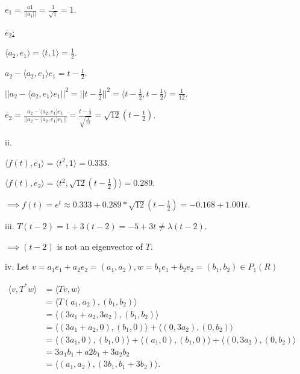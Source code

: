 \documentclass{article}
\begin{document}
  $e_1 = \frac{a1}{||a_1||} 
  = \frac{1}{\sqrt{1}} 
  = 1$.
  \newline

  \underline{$e_2$:}

  $\langle a_2, e_1\rangle 
  = \langle t, 1\rangle 
  = \frac{1}{2}$.
  \newline

  $a_2 - \langle a_2, e_1\rangle e_1 
  = t - \frac{1}{2}$.
  \newline

  $||a_2 - \langle a_2, e_1\rangle e_1||^2
  = ||t - \frac{1}{2}||^2
  = \langle t - \frac{1}{2}, t - \frac{1}{2}\rangle
  = \frac{1}{12}$.
  \newline

  $e_2 
  = \frac{a_2 - \langle a_2, e_1\rangle e_1}{||a_2 - \langle a_2, e_1\rangle e_1||}
  = \frac{t - \frac{1}{2}}{\sqrt{\frac{1}{12}}}
  = \sqrt{12}(t - \frac{1}{2})$.
  \newline


  ii. 

  $\langle f(t), e_1\rangle
  =
  \langle t^2, 1\rangle
  =
  0.333$.
  \newline

  $\langle f(t), e_2\rangle
  =
  \langle t^2, \sqrt{12}(t - \frac{1}{2})\rangle
  =
  0.289$.
  \newline

  $\implies f(t) 
  = e^t 
  \approx 
  0.333 + 0.289*\sqrt{12}(t - \frac{1}{2})
  = -0.168 + 1.001t$.
  \newline


  iii. 
  $T(t-2)
  = 1 + 3(t-2)
  = -5 + 3t
  \neq \lambda (t-2)$.

  $\implies (t-2)$ is not an eigenvector of $T$.
  \newline

  iv. Let $v = a_1 e_1 + a_2 e_2 = (a_1, a_2), w= b_1 e_1 + b_2 e_2 = (b_1, b_2) \in P_1(R)$

  \begin{align*}
    \langle
      v, T^*w
    \rangle
    &=
    \langle
      Tv, w
    \rangle &&\\
    &=
    \langle
      T(a_1, a_2), (b_1, b_2)
    \rangle &&\\
    &=
    \langle
      (3a_1 + a_2, 3a_2), (b_1, b_2)
    \rangle &&\\
    &=
    \langle
      (3a_1 + a_2, 0), (b_1, 0)
    \rangle 
    +
    \langle
      (0, 3a_2), (0, b_2)
    \rangle &&\\
    &=
    \langle
      (3a_1, 0), (b_1, 0)
    \rangle 
    +
    \langle
      (a_1, 0), (b_1, 0)
    \rangle 
    +
    \langle
      (0, 3a_2), (0, b_2)
    \rangle &&\\
    &=
    3a_1b_1 + a2b_1 + 3a_2b_2 &&\\
    &=
    \langle
      (a_1, a_2), (3b_1, b_1 + 3b_2)
    \rangle. &&\\
  \end{align*}
  
\end{document}
